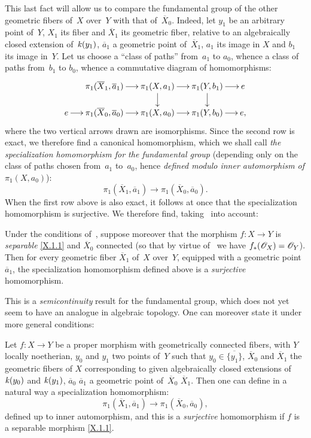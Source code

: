 This last fact will allow us to compare the fundamental group of the
other
geometric fibers of~$X$ over~$Y$ with that of~$\overline
X_0$. Indeed, let $y_1$ be an arbitrary point of~$Y$, $X_1$ its fiber
and $\overline X_1$ its geometric fiber, relative to
an algebraically closed extension of~$\mathit{k}(y_1)$, $\overline a_1$
a geometric point of~$\overline X_1$, $a_1$ its image in
$X$ and $b_1$ its image in~$Y$. Let us choose a ``class of paths''
from~$a_1$ to $a_0$, whence a class of paths from~$b_1$ to
$b_0$, whence a commutative diagram of homomorphisms:
$$
\xymatrix@=.5cm{
&\pi_1(\overline X_1,\overline a_1) \ar[r] & \pi_1(X,a_1) \ar[r]\ar[d] & \pi_1(Y,b_1) \ar[r]\ar[d] & e \\
e \ar[r]& \pi_1(\overline X_0,\overline a_0) \ar[r] & \pi_1(X,a_0) \ar[r] &\pi_1(Y,b_0) \ar[r] & e,
}
$$
where the two vertical arrows drawn are
isomorphisms. Since the second row is exact, we therefore find
a canonical homomorphism, which we shall call \emph{the specialization
homomorphism for the fundamental group} (depending only
on the class of paths chosen from~$a_1$ to~$a_0$, hence
\emph{defined modulo inner automorphism of}
$\pi_1(X,a_0)$):
$$
\pi_1(\overline X_1,\overline a_1)\to \pi_1(\overline X_0,\overline
a_0).
$$
When the first row above is also exact, it
follows at once that the specialization homomorphism
is surjective. We therefore find, taking~ into account:

\begin{corollary}
\label{X.2.3}
Under the conditions of~, suppose moreover that the morphism
$f\colon X\to Y$ is \emph{separable} \eqref{X.1.1} and $\overline
X_0$ connected (so that by virtue of~ we have
$f_*(\cal{O}_X)=\cal{O}_Y$). Then for every geometric
fiber $\overline X_1$ of~$X$ over~$Y$, equipped with a geometric
point $\overline a_1$, the specialization homomorphism
defined above is a \emph{surjective} homomorphism.
\end{corollary}
This is a \emph{semicontinuity} result for the
fundamental group, which does not yet seem to have an analogue in
algebraic topology. One can moreover state it under more
general conditions:

\begin{corollary}
\label{X.2.4}
Let
$f\colon X\to Y$ be a proper morphism with geometrically connected
fibers, with $Y$ locally noetherian,
$y_0$ and $y_1$ two points of~$Y$ such that $y_0\in\overline{\{y_1\}}$,
$\overline X_0$ and $\overline X_1$ the geometric fibers of
$X$ corresponding to given algebraically closed extensions
of~$\mathit{k}(y_0)$ and $\mathit{k}(y_1)$, $\overline a_0$
\resp $\overline a_1$ a geometric point of~$\overline X_0$
\resp $\overline X_1$. Then one can define in a
natural way a specialization homomorphism:
$$
\pi_1(\overline X_1,\overline a_1)\to \pi_1(\overline X_0,\overline
a_0),
$$
defined up to inner automorphism, and this is
a \emph{surjective} homomorphism if $f$ is a separable
morphism \eqref{X.1.1}.
\end{corollary}

